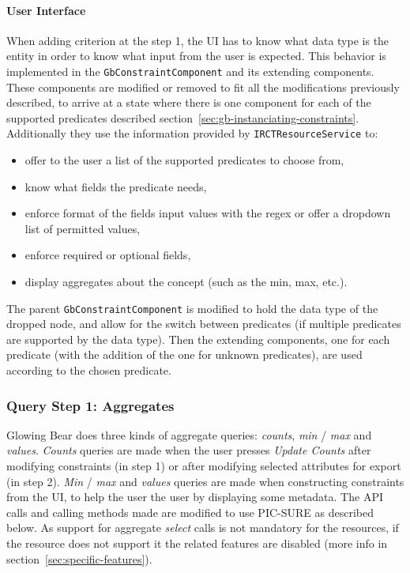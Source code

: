 \paragraph{User Interface}
When adding criterion at the step 1, the UI has to know what data type is the entity in order to know what input from the user is expected.
This behavior is implemented in the \verb|GbConstraintComponent| and its extending components.
These components are modified or removed to fit all the modifications previously described, to arrive at a state where there is one component for each of the supported predicates described section~\ref{sec:gb-instanciating-constraints}.
Additionally they use the information provided by \verb|IRCTResourceService| to:
\begin{itemize}
    \item offer to the user a list of the supported predicates to choose from,
    \item know what fields the predicate needs,
    \item enforce format of the fields input values with the regex or offer a dropdown list of permitted values, 
    \item enforce required or optional fields,
    \item display aggregates about the concept (such as the min, max, etc.).
\end{itemize}

The parent \verb|GbConstraintComponent| is modified to hold the data type of the dropped node, and allow for the switch between predicates (if multiple predicates are supported by the data type).
Then the extending components, one for each predicate (with the addition of the one for unknown predicates), are used according to the chosen predicate.


\subsubsection{Query Step 1: Aggregates}
\label{sec:gb-step1-aggregates}

Glowing Bear does three kinds of aggregate queries: \emph{counts}, \emph{min} / \emph{max} and \emph{values}. 
\emph{Counts} queries are made when the user presses \emph{Update Counts} after modifying constraints (in step 1) or after modifying selected attributes for export (in step 2).
\emph{Min} / \emph{max} and \emph{values} queries are made when constructing constraints from the UI, to help the user the user by displaying some metadata.
The API calls and calling methods made are modified to use PIC-SURE as described below.
As support for aggregate \emph{select} calls is not mandatory for the resources, if the resource does not support it the related features are disabled (more info in section~\ref{sec:specific-features}).

